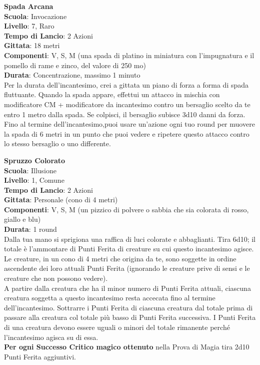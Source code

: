 \begin{multicols}{2}
\medskip\textbf{Spada Arcana}\\
\textbf{Scuola}: Invocazione\\
\textbf{Livello}: 7, Raro\\
\textbf{Tempo di Lancio}: 2 Azioni\\
\textbf{Gittata}: 18 metri\\
\textbf{Componenti}: V, S, M (una spada di platino in miniatura con l'impugnatura e il pomello di rame e zinco, del valore di 250 mo)\\
\textbf{Durata}: Concentrazione, massimo 1 minuto \\
Per la durata dell'incantesimo, crei a gittata un piano di forza a forma di spada fluttuante. Quando la spada appare, effettui un attacco in mischia con modificatore CM + modificatore da incantesimo contro un bersaglio scelto da te entro 1 metro dalla spada. Se colpisci, il bersaglio subisce 3d10 danni da forza. Fino al termine dell'incantesimo,puoi usare un'azione ogni tuo round per muovere la spada di 6 metri in un punto che puoi vedere e ripetere questo attacco contro lo stesso bersaglio o uno differente.

\medskip\textbf{Spruzzo Colorato}\\
\textbf{Scuola}: Illusione\\
\textbf{Livello}: 1, Comune\\
\textbf{Tempo di Lancio}: 2 Azioni\\
\textbf{Gittata}: Personale (cono di 4 metri)\\
\textbf{Componenti}: V, S, M (un pizzico di polvere o sabbia che sia colorata di rosso, giallo e blu)\\
\textbf{Durata}: 1 round\\
Dalla tua mano si sprigiona una raffica di luci colorate e abbaglianti. Tira 6d10; il totale è l'ammontare di Punti Ferita di creature su cui questo incantesimo agisce. Le creature, in un cono di 4 metri che origina da te, sono soggette in ordine ascendente dei loro attuali Punti Ferita (ignorando le creature prive di sensi e le creature che non possono vedere).\\
A partire dalla creatura che ha il minor numero di Punti Ferita attuali, ciascuna creatura soggetta a questo incantesimo resta accecata fino al termine dell'incantesimo. Sottrarre i Punti Ferita di ciascuna creatura dal totale prima di passare alla creatura col totale più basso di Punti Ferita successiva. I Punti Ferita di una creatura devono essere uguali o minori del totale rimanente perché l'incantesimo agisca su di essa. \\
\textbf{Per ogni Successo Critico magico ottenuto} nella Prova di Magia tira 2d10 Punti Ferita aggiuntivi.


\end{multicols}
